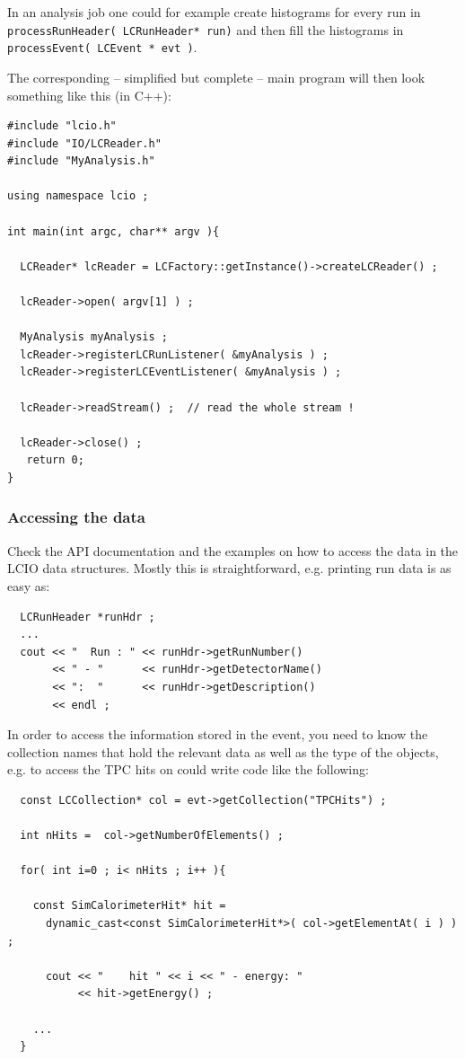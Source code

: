 \documentclass[twoside]{article}
\begin{document}
In an analysis job one could for example create histograms for every run in \\
\verb$processRunHeader( LCRunHeader* run)$
and then fill the histograms in \verb$processEvent( LCEvent * evt )$.

The corresponding -- simplified but complete -- main program will then look something 
like this (in C++):

\begin{verbatim}
#include "lcio.h"
#include "IO/LCReader.h"
#include "MyAnalysis.h"

using namespace lcio ;

int main(int argc, char** argv ){

  LCReader* lcReader = LCFactory::getInstance()->createLCReader() ;
  
  lcReader->open( argv[1] ) ;

  MyAnalysis myAnalysis ;
  lcReader->registerLCRunListener( &myAnalysis ) ;
  lcReader->registerLCEventListener( &myAnalysis ) ;

  lcReader->readStream() ;  // read the whole stream !

  lcReader->close() ;
   return 0;
}
\end{verbatim}


\subsubsection{Accessing the data}
Check the API documentation and the examples on how to access the data in the LCIO data structures.
Mostly this is straightforward, e.g. printing run data is as easy as:

\begin{verbatim}
  LCRunHeader *runHdr ;
  ...  
  cout << "  Run : " << runHdr->getRunNumber() 
       << " - "      << runHdr->getDetectorName() 
       << ":  "      << runHdr->getDescription()  
       << endl ;
\end{verbatim}

In order to access the information stored in the event, you need to know the collection names that 
hold the relevant data as well as the type of the objects, e.g. to access the TPC hits on could 
write code like the following:

\begin{verbatim}
  const LCCollection* col = evt->getCollection("TPCHits") ;

  int nHits =  col->getNumberOfElements() ;

  for( int i=0 ; i< nHits ; i++ ){

    const SimCalorimeterHit* hit = 
      dynamic_cast<const SimCalorimeterHit*>( col->getElementAt( i ) ) ;

      cout << "    hit " << i << " - energy: "  
           << hit->getEnergy() ;

    ...
  }
\end{verbatim}
\end{document}
